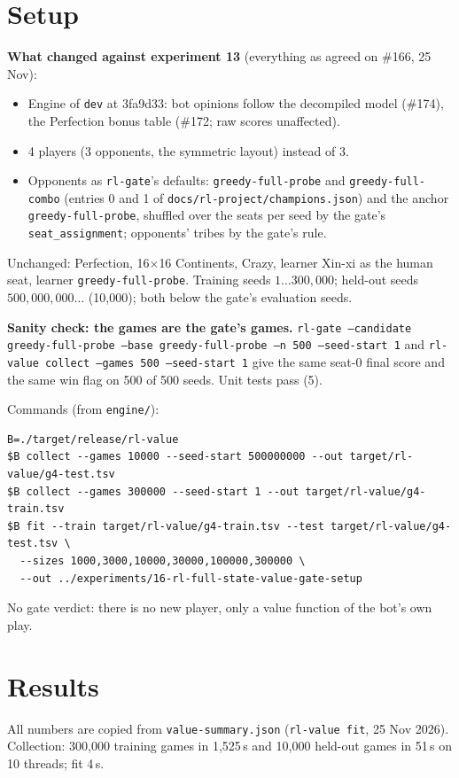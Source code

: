 \documentclass{../polyexp}
\begin{document}
\section{Setup}
\textbf{What changed against experiment 13} (everything as agreed on \#166, 25 Nov):
\begin{itemize}
  \item Engine of \texttt{dev} at 3fa9d33: bot opinions follow the decompiled model (\#174), the Perfection bonus
        table (\#172; raw scores unaffected).
  \item 4 players (3 opponents, the symmetric layout) instead of 3.
  \item Opponents as \texttt{rl-gate}'s defaults: \texttt{greedy-full-probe} and \texttt{greedy-full-combo} (entries 0
        and 1 of \texttt{docs/rl-project/champions.json}) and the anchor \texttt{greedy-full-probe}, shuffled over
        the seats per seed by the gate's \texttt{seat\_assignment}; opponents' tribes by the gate's rule.
\end{itemize}
Unchanged: Perfection, 16$\times$16 Continents, Crazy, learner Xin-xi as the human seat, learner
\texttt{greedy-full-probe}. Training seeds $1\dots300{,}000$; held-out seeds $500{,}000{,}000\dots$ (10{,}000);
both below the gate's evaluation seeds.

\textbf{Sanity check: the games are the gate's games.} \texttt{rl-gate --candidate greedy-full-probe --base
greedy-full-probe --n 500 --seed-start 1} and \texttt{rl-value collect --games 500 --seed-start 1} give the same
seat-0 final score and the same win flag on 500 of 500 seeds. Unit tests pass (5).

Commands (from \texttt{engine/}):
\begin{verbatim}
B=./target/release/rl-value
$B collect --games 10000 --seed-start 500000000 --out target/rl-value/g4-test.tsv
$B collect --games 300000 --seed-start 1 --out target/rl-value/g4-train.tsv
$B fit --train target/rl-value/g4-train.tsv --test target/rl-value/g4-test.tsv \
  --sizes 1000,3000,10000,30000,100000,300000 \
  --out ../experiments/16-rl-full-state-value-gate-setup
\end{verbatim}
No gate verdict: there is no new player, only a value function of the bot's own play.

\section{Results}
\ExpResults

All numbers are copied from \texttt{value-summary.json} (\texttt{rl-value fit}, 25 Nov 2026). Collection: 300{,}000
training games in 1{,}525\,s and 10{,}000 held-out games in 51\,s on 10 threads; fit 4\,s.
\end{document}
